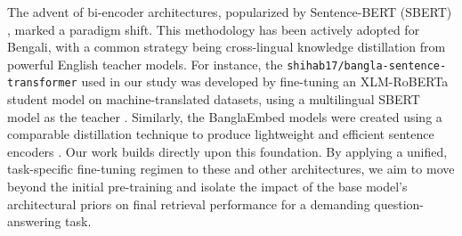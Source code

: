 \documentclass[manuscript,screen,review]{acmart}
\begin{document}
The advent of bi-encoder architectures, popularized by Sentence-BERT (SBERT) \cite{reimers2019sentence}, marked a paradigm shift. This methodology has been actively adopted for Bengali, with a common strategy being cross-lingual knowledge distillation from powerful English teacher models. For instance, the \texttt{shihab17/bangla-sentence-transformer} used in our study was developed by fine-tuning an XLM-RoBERTa student model on machine-translated datasets, using a multilingual SBERT model as the teacher \cite{uddin2024bangla}. Similarly, the BanglaEmbed models were created using a comparable distillation technique to produce lightweight and efficient sentence encoders \cite{kabir2024banglaembed}. Our work builds directly upon this foundation. By applying a unified, task-specific fine-tuning regimen to these and other architectures, we aim to move beyond the initial pre-training and isolate the impact of the base model's architectural priors on final retrieval performance for a demanding question-answering task.
\end{document}
